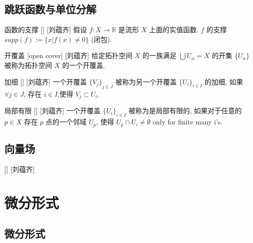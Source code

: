 \documentclass[UTF8]{ctexart}
\begin{document}
    \subsection{跳跃函数与单位分解}
    
        \begin{dfn}
            []
            {函数的支撑}
            []
            [刘蕴齐]
            假设 \(f: X \to \mathbb{R}\)  是流形 \(X\) 上面的实值函数. 
             \(f\)  的支撑  \(supp(f):= \overline{\{ x | f(x) \neq 0 \}}\) (闭包).
        \end{dfn}

        \begin{dfn}
            []
            {开覆盖}
            [open cover]
            [刘蕴齐]
            给定拓扑空间 \(X\) 的一族满足 \(\bigcup U_{\alpha} = X\) 的开集 \(\{U_{\alpha} \}\) 被称为拓扑空间 \(X\) 的一个开覆盖. 
        \end{dfn}

        \begin{dfn}
            []
            {加细}
            []
            [刘蕴齐]
            一个开覆盖 \({\{V_j\}}_{j \in J}\)  被称为另一个开覆盖 \({\{U_i\}}_{i \in I}\) 的加细, 如果  \(\forall j \in J\), 存在 \(i \in I\),使得 \(V_j \subset U_i\). 
        \end{dfn}

        \begin{dfn}
            []
            {局部有限}
            []
            [刘蕴齐]
            一个开覆盖 \({\{U_i\}}_{i \in I}\) 被称为是局部有限的, 如果对于任意的 \(p \in X\) 
            存在 \(p\) 点的一个邻域 \(U_p\), 使得  \(U_p \cap U_i \neq \emptyset\)  only for finite many i's.
        \end{dfn}

    \subsection{向量场}
    
        \begin{dfn}
            []
            {}
            []
            [刘蕴齐]
        \end{dfn}
    
\section{微分形式}

    \subsection{微分形式}
        
\end{document}
